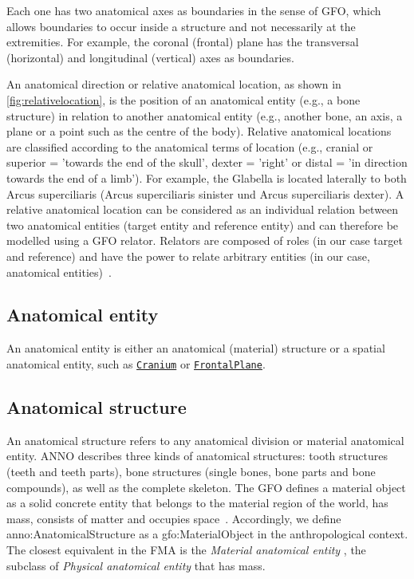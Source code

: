 \documentclass[sw]{iosart2x}
\newcommand{\anno}[1]{\href{https://annosaxfdm.de/ontology/#1}{\texttt{#1}}}
\begin{document}
Each one has two anatomical axes as boundaries in the sense of GFO, which allows boundaries to occur inside a structure and not necessarily at the extremities.
For example, the coronal (frontal) plane has the transversal (horizontal) and longitudinal (vertical) axes as boundaries.

An anatomical direction or relative anatomical location, as shown in \cref{fig:relativelocation}, is the position of an anatomical entity (e.g., a bone structure) in relation to another anatomical entity (e.g., another bone, an axis, a plane or a point such as the centre of the body).
Relative anatomical locations are classified according to the anatomical terms of location (e.g., cranial or superior = 'towards the end of the skull', dexter = 'right' or distal = 'in direction towards the end of a limb').
For example, the Glabella is located laterally to both Arcus superciliaris (Arcus superciliaris sinister und Arcus superciliaris dexter).
A relative anatomical location can be considered as an individual relation between two anatomical entities (target entity and reference entity) and can therefore be modelled using a GFO relator.
Relators are composed of roles (in our case target and reference) and have the power to relate arbitrary entities (in our case, anatomical entities)~\citep{gfocategory}.


\subsection{Anatomical entity}
An anatomical entity is either an anatomical (material) structure or a spatial anatomical entity, such as \anno{Cranium} or \anno{FrontalPlane}.

\subsection{Anatomical structure}
An anatomical structure refers to any anatomical division or material anatomical entity.
ANNO describes three kinds of anatomical structures: tooth structures (teeth and teeth parts), bone structures (single bones, bone parts and bone compounds), as well as the complete skeleton.
The GFO defines a material object  as a solid concrete entity that belongs to the material region of the world, has mass, consists of matter and occupies space~\citep{gfospace}.
Accordingly, we define anno:AnatomicalStructure as a gfo:MaterialObject in the anthropological context.
The closest equivalent in the FMA is the \emph{Material anatomical entity} , the subclass of \emph{Physical anatomical entity}  that has mass.
\end{document}
